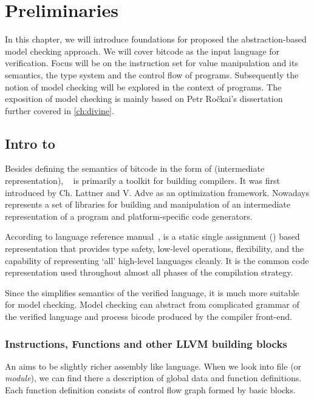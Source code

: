 \chapter{Preliminaries}\label{ch:preliminaries}

In this chapter, we will introduce foundations for proposed the
abstraction-based model checking approach. We will cover \LLVM bitcode as the
input language for verification. Focus will be on the instruction set for
value manipulation and its semantics, the \LLVM type system and the control flow
of programs. Subsequently the notion of model checking will be explored in
the context of \LLVM programs. The exposition of model checking is mainly based on
Petr Ročkai's dissertation \cite{Rockai15} further covered in \autoref{ch:divine}.

\section{Intro to \LLVMIR} \label{sec:introtollvm}

Besides defining the semantics of bitcode in the form of \LLVMIR (intermediate
representation), \LLVM{}~\cite{LLVM:web} is primarily a toolkit for building
compilers. It was first introduced by Ch. Lattner and V. Adve \cite{Lattner04}
as an optimization framework. Nowadays \LLVM represents a set of libraries for
building and manipulation of an intermediate representation of a program and
platform-specific code generators.

According to \LLVM language reference manual~\cite{LLVM:langref},
\LLVM is a static single assignment (\SSA) based representation that
provides type safety, low-level operations, flexibility, and
the capability of representing ‘all’ high-level languages cleanly. It is the
common code representation used throughout almost all phases of the \LLVM compilation
strategy.

Since the \LLVMIR simplifies semantics of the verified language, it is much more
suitable for model checking. Model checking can abstract from complicated
grammar of the verified language and process \LLVM bicode produced by the compiler
front-end.

\subsection{Instructions, Functions and other LLVM building blocks} \label{subsec:infnllvm}
An \LLVMIR aims to be slightly richer assembly like language. When we look
into \LLVMIR file (or \emph{module}), we can find there a description of global
data and function definitions. Each function definition consists of control flow graph
formed by basic blocks.

